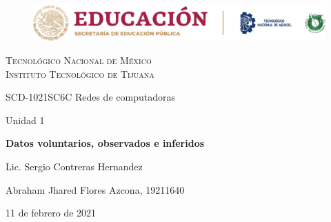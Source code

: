 \documentclass[stu, 12pt, letterpaper, donotrepeattitle, floatsintext, natbib]{apa7}
\begin{document}
    \begin{titlepage}
        \begin{figure}[ht]
            \centering
            \includegraphics[width=15cm]{logosITT.png}
        \end{figure}
        \centering
        {\Large\scshape Tecnológico Nacional de México\\Instituto Tecnológico de Tijuana\par}
        \vspace{1cm}
        {\Large SCD-1021SC6C Redes de computadoras\par}
        \vspace{1cm}
        {\Large Unidad 1\par}
        \vspace{2cm}
        {\Large\bfseries Datos voluntarios, observados e inferidos\par}
        \vspace{2cm}
        {\large Lic. Sergio Contreras Hernandez\par}
        \vfill
            {\large Abraham Jhared Flores Azcona, 19211640\par}
        \vfill
        {\large 11 de febrero de 2021}
    \end{titlepage}

\renewcommand\contentsname{Contenido}

\newpage
\end{document}

